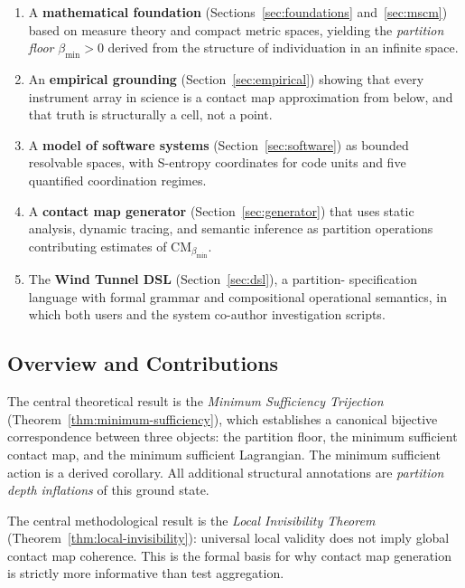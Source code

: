 \documentclass[12pt,a4paper,twocolumn]{article}
\theoremstyle{plain}
\theoremstyle{definition}
\theoremstyle{remark}
\newcommand{\CM}{\mathrm{CM}}
\newcommand{\bmin}{\beta_{\min}}
\newcommand{\CMbmin}{\CM_{\bmin}}
\begin{document}
\begin{enumerate}[label=(\roman*)]
\item A \textbf{mathematical foundation} (Sections~\ref{sec:foundations}
  and~\ref{sec:mscm}) based on measure theory and compact metric spaces,
  yielding the \emph{partition floor} $\bmin > 0$ derived from the
  structure of individuation in an infinite space.

\item An \textbf{empirical grounding} (Section~\ref{sec:empirical}) showing
  that every instrument array in science is a contact map approximation from
  below, and that truth is structurally a cell, not a point.

\item A \textbf{model of software systems} (Section~\ref{sec:software}) as
  bounded resolvable spaces, with S-entropy coordinates for code units and
  five quantified coordination regimes.

\item A \textbf{contact map generator} (Section~\ref{sec:generator}) that
  uses static analysis, dynamic tracing, and semantic inference as partition
  operations contributing estimates of $\CMbmin$.

\item The \textbf{Wind Tunnel DSL} (Section~\ref{sec:dsl}), a partition-
  specification language with formal grammar and compositional operational
  semantics, in which both users and the system co-author investigation
  scripts.
\end{enumerate}

\subsection{Overview and Contributions}

The central theoretical result is the \emph{Minimum Sufficiency Trijection}
(Theorem~\ref{thm:minimum-sufficiency}), which establishes a canonical
bijective correspondence between three objects: the partition floor, the
minimum sufficient contact map, and the minimum sufficient Lagrangian.  The
minimum sufficient action is a derived corollary.  All additional structural
annotations are \emph{partition depth inflations} of this ground state.

The central methodological result is the \emph{Local Invisibility Theorem}
(Theorem~\ref{thm:local-invisibility}): universal local validity does not
imply global contact map coherence.  This is the formal basis for why
contact map generation is strictly more informative than test aggregation.
\end{document}
